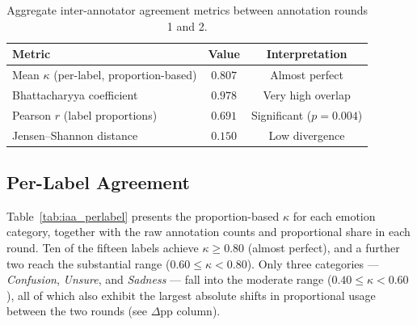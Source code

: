 \begin{table}[ht]
    \centering
    \caption{Aggregate inter-annotator agreement metrics between annotation rounds 1 and 2.}
    \label{tab:iaa_aggregate}
    \begin{tabular}{lcc}
        \toprule
        \textbf{Metric} & \textbf{Value} & \textbf{Interpretation} \\
        \midrule
        Mean $\kappa$ (per-label, proportion-based) & $0.807$ & Almost perfect \\
        Bhattacharyya coefficient                   & $0.978$ & Very high overlap \\
        Pearson $r$ (label proportions)             & $0.691$ & Significant ($p=0.004$) \\
        Jensen--Shannon distance                    & $0.150$ & Low divergence \\
        \bottomrule
    \end{tabular}
\end{table}

\subsection{Per-Label Agreement}

Table~\ref{tab:iaa_perlabel} presents the proportion-based $\kappa$ for each emotion
category, together with the raw annotation counts and proportional share in each round.
Ten of the fifteen labels achieve $\kappa \geq 0.80$ (almost perfect), and a further two
reach the substantial range ($0.60 \leq \kappa < 0.80$). Only three categories —
\textit{Confusion}, \textit{Unsure}, and \textit{Sadness} — fall into the moderate range
($0.40 \leq \kappa < 0.60$), all of which also exhibit the largest absolute shifts in
proportional usage between the two rounds (see $\Delta$pp column).

